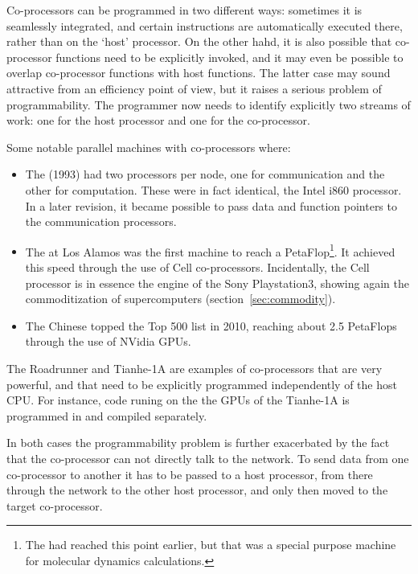Co-processors can be programmed in two different ways: sometimes 
it is seamlessly integrated, and certain instructions are
automatically executed there, rather than on the `host' processor. On
the other hahd, it is also possible that co-processor functions need
to be explicitly invoked, and it may even be possible to overlap
co-processor functions with host functions. The latter case may sound
attractive from an efficiency point of view, but it raises a serious
problem of programmability. The programmer now needs to identify
explicitly two streams of work: one for the host processor and one for
the co-processor.

Some notable parallel machines with co-processors where:
\begin{itemize}
\item The  (1993) had two processors per
  node, one for communication and the other for computation. These
  were in fact identical, the Intel i860
  processor. In a later revision, it became possible to pass data and
  function pointers to the communication processors.
\item The  at Los Alamos was the first
  machine to reach a PetaFlop\footnote{The 
    had reached this point earlier, but that was a special purpose
    machine for molecular dynamics calculations.}. It achieved this
  speed through the use of Cell
  co-processors. Incidentally, the Cell processor is in essence the
  engine of the Sony Playstation3, showing again the commoditization
  of supercomputers (section~\ref{sec:commodity}).
\item The Chinese  topped the Top 500 list in
  2010, reaching about 2.5 PetaFlops through the use of
  NVidia \acp{GPU}.
\end{itemize}
The Roadrunner and Tianhe-1A are examples of co-processors that are
very powerful, and that need to be explicitly programmed independently
of the host CPU. For instance, code runing on the the \acp{GPU} of the
Tianhe-1A is programmed in  and compiled separately.

In both cases the programmability problem is further exacerbated by
the fact that the co-processor can not directly talk to the network.
To send data from one co-processor to another it has to be passed to a
host processor, from there through the network to the other host
processor, and only then moved to the target co-processor.

